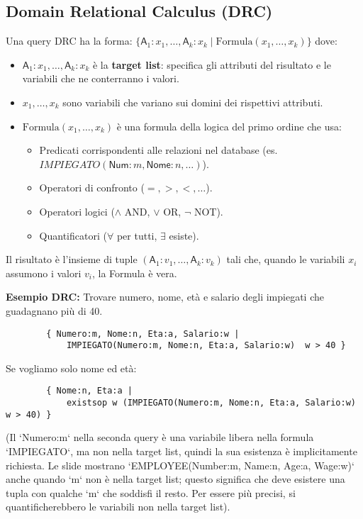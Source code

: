 \documentclass{article}
\newcommand{\Rel}[1]{\textit{#1}} %
\newcommand{\Attr}[1]{\textsf{#1}} %
\newcommand{\mylandop}{\wedge}
\newcommand{\myvel}{\vee}
\newcommand{\mynegop}{\neg}
\newcommand{\myforallop}{\forall}
\newcommand{\myexistsop}{\exists}
\begin{document}
	\subsection{Domain Relational Calculus (DRC)}
	Una query DRC ha la forma:
	$\{ \Attr{A}_1:x_1, \dots, \Attr{A}_k:x_k \mid \text{Formula}(x_1, \dots, x_k) \}$
	dove:
	\begin{itemize}
		\item $\Attr{A}_1:x_1, \dots, \Attr{A}_k:x_k$ è la \textbf{target list}: specifica gli attributi del risultato e le variabili che ne conterranno i valori.
		\item $x_1, \dots, x_k$ sono variabili che variano sui domini dei rispettivi attributi.
		\item $\text{Formula}(x_1, \dots, x_k)$ è una formula della logica del primo ordine che usa:
		\begin{itemize}
			\item Predicati corrispondenti alle relazioni nel database (es. $\Rel{IMPIEGATO}(\Attr{Num}:m, \Attr{Nome}:n, \dots)$).
			\item Operatori di confronto ($=, >, <, \dots$).
			\item Operatori logici ($\mylandop$ AND, $\myvel$ OR, $\mynegop$ NOT).
			\item Quantificatori ($\myforallop$ per tutti, $\myexistsop$ esiste).
		\end{itemize}
	\end{itemize}
	Il risultato è l'insieme di tuple $(\Attr{A}_1:v_1, \dots, \Attr{A}_k:v_k)$ tali che, quando le variabili $x_i$ assumono i valori $v_i$, la Formula è vera.
	
	\textbf{Esempio DRC:} Trovare numero, nome, età e salario degli impiegati che guadagnano più di 40.
	\begin{verbatim}
		{ Numero:m, Nome:n, Eta:a, Salario:w |
			IMPIEGATO(Numero:m, Nome:n, Eta:a, Salario:w)  w > 40 }
	\end{verbatim}
	Se vogliamo solo nome ed età:
	\begin{verbatim}
		{ Nome:n, Eta:a |
			existsop w (IMPIEGATO(Numero:m, Nome:n, Eta:a, Salario:w)  w > 40) }
	\end{verbatim}
	(Il `Numero:m` nella seconda query è una variabile libera nella formula `IMPIEGATO`, ma non nella target list, quindi la sua esistenza è implicitamente richiesta. Le slide mostrano `EMPLOYEE(Number:m, Name:n, Age:a, Wage:w)` anche quando `m` non è nella target list; questo significa che deve esistere una tupla con qualche `m` che soddisfi il resto. Per essere più precisi, si quantificherebbero le variabili non nella target list).
	
\end{document}
